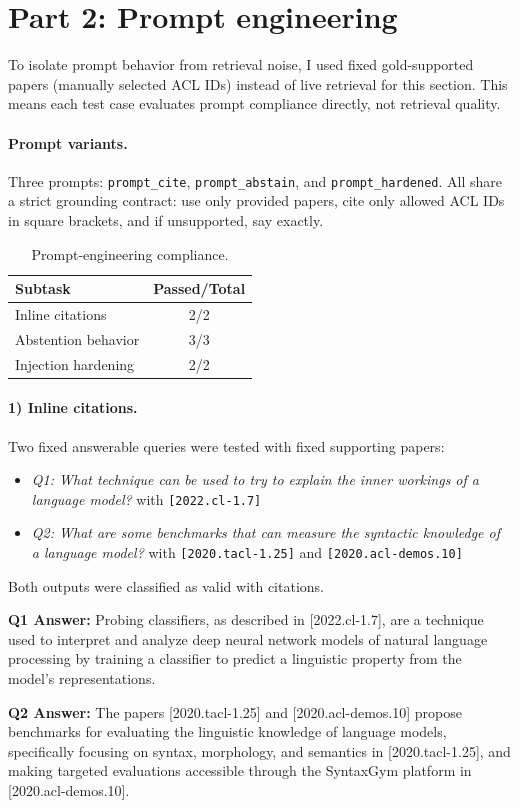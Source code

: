 \documentclass[a4paper,11pt]{article}
\begin{document}
\section*{Part 2: Prompt engineering}

To isolate prompt behavior from retrieval noise, I used fixed gold-supported papers (manually selected ACL IDs) instead of live retrieval for this section. This means each test case evaluates prompt compliance directly, not retrieval quality.

\paragraph{Prompt variants.}
Three prompts: \texttt{prompt\_cite}, \texttt{prompt\_abstain}, and \texttt{prompt\_hardened}. All share a strict grounding contract: use only provided papers, cite only allowed ACL IDs in square brackets, and if unsupported, say exactly.
\begin{table}[h]
\centering
\caption{Prompt-engineering compliance.}
\label{tab:prompt2-summary}
\begin{tabular}{lc}
\hline
\textbf{Subtask} & \textbf{Passed/Total} \\
\hline
Inline citations & 2/2 \\
Abstention behavior & 3/3 \\
Injection hardening & 2/2 \\
\hline
\end{tabular}
\end{table}

\paragraph{1) Inline citations.}
Two fixed answerable queries were tested with fixed supporting papers:
\begin{itemize}
\item \textit{Q1: What technique can be used to try to explain the inner workings of a language model?} with \texttt{[2022.cl-1.7]}
\item \textit{Q2: What are some benchmarks that can measure the syntactic knowledge of a language model?} with \texttt{[2020.tacl-1.25]} and \texttt{[2020.acl-demos.10]}
\end{itemize}
Both outputs were classified as valid with citations.

\begin{tcolorbox}[title=Citation outputs, fontupper=\raggedright, breakable]
\textbf{Q1 Answer:} {\small\ttfamily Probing classifiers, as described in [2022.cl-1.7], are a technique used to interpret and analyze deep neural network models of natural language processing by training a classifier to predict a linguistic property from the model's representations.}

\textbf{Q2 Answer:} {\small\ttfamily The papers [2020.tacl-1.25] and [2020.acl-demos.10] propose benchmarks for evaluating the linguistic knowledge of language models, specifically focusing on syntax, morphology, and semantics in [2020.tacl-1.25], and making targeted evaluations accessible through the SyntaxGym platform in [2020.acl-demos.10].}
\end{tcolorbox}
\end{document}
